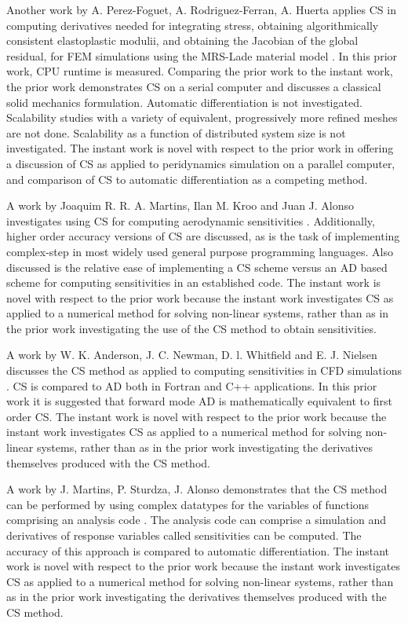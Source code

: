 \documentclass[preprint,12pt]{elsarticle}
\begin{document}
Another work by A. Perez-Foguet, A. Rodriguez-Ferran, A. Huerta applies CS in
computing derivatives needed for integrating stress, obtaining algorithmically
consistent elastoplastic modulii, and obtaining the Jacobian of the global
residual, for FEM simulations using the MRS-Lade material model
\cite{perez2012numerical}. In this prior work, CPU runtime is measured.
Comparing the prior work to the instant work, the prior work demonstrates CS on
a serial computer and discusses a classical solid mechanics formulation.
Automatic differentiation is not investigated.  Scalability studies with a
variety of equivalent, progressively more refined meshes are not done.
Scalability as a function of distributed system size is not investigated.  The
instant work is novel with respect to the prior work in offering a discussion
of CS as applied to peridynamics simulation on a parallel computer, and
comparison of CS to automatic differentiation as a competing method. 

A work by Joaquim R. R. A. Martins, Ilan M. Kroo and Juan J. Alonso
investigates using CS for computing aerodynamic sensitivities
\cite{martins2000automated}. Additionally, higher order accuracy versions of CS
are discussed, as is the task of implementing complex-step in most widely used
general purpose programming languages. Also discussed is the relative ease of
implementing a CS scheme versus an AD based scheme for computing sensitivities
in an established code. The instant work is novel with respect to the prior
work because the instant work investigates CS as applied to a numerical method
for solving non-linear systems, rather than as in the prior work investigating
the use of the CS method to obtain sensitivities.

A work by W. K. Anderson, J. C. Newman, D. l. Whitfield and E. J. Nielsen
discusses the CS method as applied to computing sensitivities in CFD simulations
\cite{anderson2001sensitivity}. CS is compared to AD both in Fortran and C++
applications. In this prior work it is suggested that forward mode AD is
mathematically equivalent to first order CS. The instant work is novel with
respect to the prior work because the instant work investigates CS as applied
to a numerical method for solving non-linear systems, rather than as in the
prior work investigating the derivatives themselves produced with the CS
method.

A work by J. Martins, P. Sturdza, J. Alonso demonstrates that the CS method can
be performed by using complex datatypes for the variables of functions
comprising an analysis code \cite{martins2003complex}. The analysis code can
comprise a simulation and derivatives of response variables called
sensitivities can be computed. The accuracy of this approach is compared to
automatic differentiation. The instant work is novel with respect to the prior
work because the instant work investigates CS as applied to a numerical method
for solving non-linear systems, rather than as in the prior work investigating
the derivatives themselves produced with the CS method.
 
\end{document}
